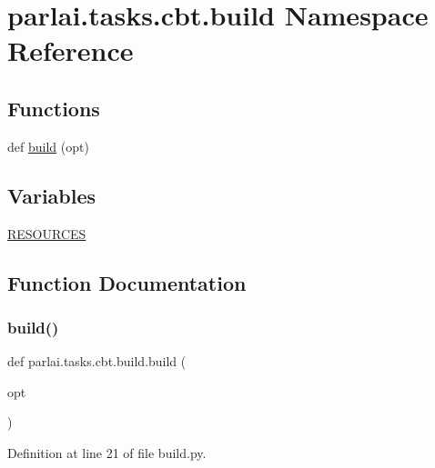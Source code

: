 \hypertarget{namespaceparlai_1_1tasks_1_1cbt_1_1build}{}\section{parlai.\+tasks.\+cbt.\+build Namespace Reference}
\label{namespaceparlai_1_1tasks_1_1cbt_1_1build}
\subsection*{Functions}
\begin{DoxyCompactItemize}
\item 
def \hyperlink{namespaceparlai_1_1tasks_1_1cbt_1_1build_a761a40fc1977992c31cb21a230ba12c5}{build} (opt)
\end{DoxyCompactItemize}
\subsection*{Variables}
\begin{DoxyCompactItemize}
\item 
\hyperlink{namespaceparlai_1_1tasks_1_1cbt_1_1build_ae61376a94258f62bf821655af3f1f3cf}{R\+E\+S\+O\+U\+R\+C\+ES}
\end{DoxyCompactItemize}


\subsection{Function Documentation}
\mbox{\label{namespaceparlai_1_1tasks_1_1cbt_1_1build_a761a40fc1977992c31cb21a230ba12c5}} 
\subsubsection{\texorpdfstring{build()}{build()}}
{\footnotesize\ttfamily def parlai.\+tasks.\+cbt.\+build.\+build (\begin{DoxyParamCaption}\item[{}]{opt }\end{DoxyParamCaption})}



Definition at line 21 of file build.\+py.


